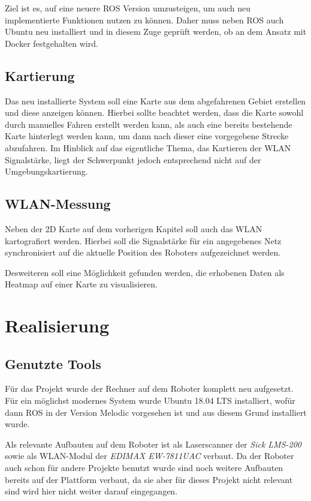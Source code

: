 \documentclass{scrartcl}%
\begin{document}
Ziel ist es, auf eine neuere ROS Version umzusteigen, um auch neu implementierte Funktionen nutzen zu können. Daher muss neben ROS auch Ubuntu neu installiert und in diesem Zuge geprüft werden, ob an dem Ansatz mit Docker festgehalten wird.

\subsection{Kartierung}
Das neu installierte System soll eine Karte aus dem abgefahrenen Gebiet erstellen und diese anzeigen können. Hierbei sollte beachtet werden, dass die Karte sowohl durch manuelles Fahren erstellt werden kann, als auch eine bereits bestehende Karte hinterlegt werden kann, um dann nach dieser eine vorgegebene Strecke abzufahren. Im Hinblick auf das eigentliche Thema, das Kartieren der WLAN Signalstärke, liegt der Schwerpunkt jedoch entsprechend nicht auf der Umgebungskartierung.

\subsection{WLAN-Messung}
Neben der 2D Karte auf dem vorherigen Kapitel soll auch das WLAN kartografiert werden. Hierbei soll die Signalstärke für ein angegebenes Netz synchronisiert auf die aktuelle Position des Roboters aufgezeichnet werden.

Desweiteren soll eine Möglichkeit gefunden werden, die erhobenen Daten als Heatmap auf einer Karte zu visualisieren.

\newpage
\section{Realisierung}
\subsection{Genutzte Tools}
Für das Projekt wurde der Rechner auf dem Roboter komplett neu aufgesetzt. Für ein möglichst modernes System wurde Ubuntu 18.04 LTS installiert, wofür dann ROS in der Version Melodic vorgesehen ist und aus diesem Grund installiert wurde.

Als relevante Aufbauten auf dem Roboter ist als Laserscanner der \textit{Sick LMS-200} sowie als WLAN-Modul der \textit{EDIMAX EW-7811UAC} verbaut. Da der Roboter auch schon für andere Projekte benutzt wurde sind noch weitere Aufbauten bereits auf der Plattform verbaut, da sie aber für dieses Projekt nicht relevant sind wird hier nicht weiter darauf eingegangen.
\end{document}
